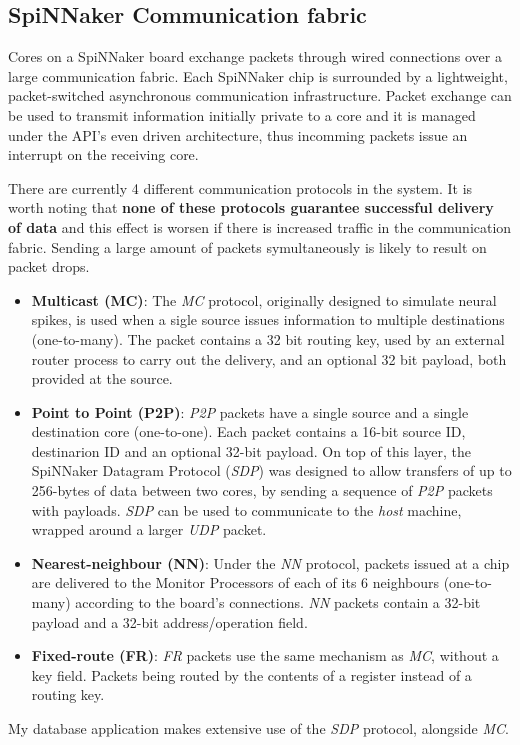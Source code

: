 \subsection{SpiNNaker Communication fabric}
Cores on a SpiNNaker board exchange packets through wired connections over a large communication fabric. Each SpiNNaker chip is surrounded by a lightweight, packet-switched asynchronous communication infrastructure.\cite{spinnchip} Packet exchange can be used to transmit information initially private to a core and it is managed under the API's even driven architecture, thus incomming packets issue an interrupt on the receiving core.

There are currently 4 different communication protocols in the system. It is worth noting that \textbf{none of these protocols guarantee successful delivery of data} and this effect is worsen if there is increased traffic in the communication fabric. Sending a large amount of packets symultaneously is likely to result on packet drops.

\begin{itemize}
\item \textbf{Multicast (MC)}: The \textit{MC} protocol, originally designed to simulate neural spikes, is used when a sigle source issues information to multiple destinations (one-to-many). The packet contains a 32 bit routing key, used by an external router process to carry out the delivery, and an optional 32 bit payload, both provided at the source.

\item \textbf{Point to Point (P2P)}: \textit{P2P} packets have a single source and a single destination core (one-to-one). Each packet contains a 16-bit source ID, destinarion ID and an optional 32-bit payload.\cite{datasheet}
On top of this layer, the SpiNNaker Datagram Protocol (\textit{SDP}) was designed to allow transfers of up to 256-bytes of data between two cores, by sending a sequence of \textit{P2P} packets with payloads.\cite{sdp} \textit{SDP} can be used to communicate to the \textit{host} machine, wrapped around a larger \textit{UDP} packet.

\item \textbf{Nearest-neighbour (NN)}: Under the \textit{NN} protocol, packets issued at a chip are delivered to the Monitor Processors of each of its 6 neighbours (one-to-many) according to the board's connections. \textit{NN} packets contain a 32-bit payload and a 32-bit address/operation field.\cite{datasheet}

\item \textbf{Fixed-route (FR)}: \textit{FR} packets use the same mechanism as \textit{MC}, without a key field. Packets being routed by the contents of a register instead of a routing key. 
\end{itemize}

My database application makes extensive use of the \textit{SDP} protocol, alongside \textit{MC}.


